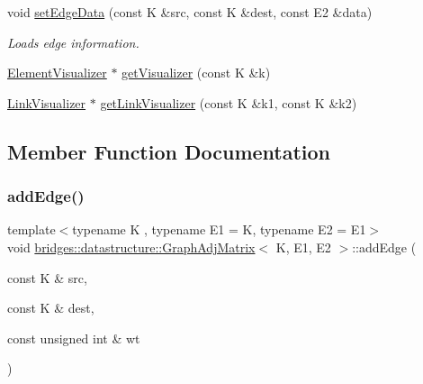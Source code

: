 \begin{DoxyCompactItemize}
\item 
void \mbox{\hyperlink{classbridges_1_1datastructure_1_1_graph_adj_matrix_a9367d6bee5ce194bad2c8ca105d5be2f}{set\+Edge\+Data}} (const K \&src, const K \&dest, const E2 \&data)
\begin{DoxyCompactList}\small\item\em Loads edge information. \end{DoxyCompactList}\item 
\mbox{\hyperlink{classbridges_1_1datastructure_1_1_element_visualizer}{Element\+Visualizer}} $\ast$ \mbox{\hyperlink{classbridges_1_1datastructure_1_1_graph_adj_matrix_ad17ebd77b7fd42bd440aa5bbf313c752}{get\+Visualizer}} (const K \&k)
\item 
\mbox{\hyperlink{classbridges_1_1datastructure_1_1_link_visualizer}{Link\+Visualizer}} $\ast$ \mbox{\hyperlink{classbridges_1_1datastructure_1_1_graph_adj_matrix_ab41a062af77b11e5cc034f7c21d12421}{get\+Link\+Visualizer}} (const K \&k1, const K \&k2)
\end{DoxyCompactItemize}


\subsection{Member Function Documentation}
\mbox{\label{classbridges_1_1datastructure_1_1_graph_adj_matrix_ab23870ac203b3784157ecb05443494a4}} 
\subsubsection{\texorpdfstring{add\+Edge()}{addEdge()}}
{\footnotesize\ttfamily template$<$typename K , typename E1  = K, typename E2  = E1$>$ \\
void \mbox{\hyperlink{classbridges_1_1datastructure_1_1_graph_adj_matrix}{bridges\+::datastructure\+::\+Graph\+Adj\+Matrix}}$<$ K, E1, E2 $>$\+::add\+Edge (\begin{DoxyParamCaption}\item[{const K \&}]{src,  }\item[{const K \&}]{dest,  }\item[{const unsigned int \&}]{wt }\end{DoxyParamCaption})\hspace{0.3cm}{\ttfamily [inline]}}

